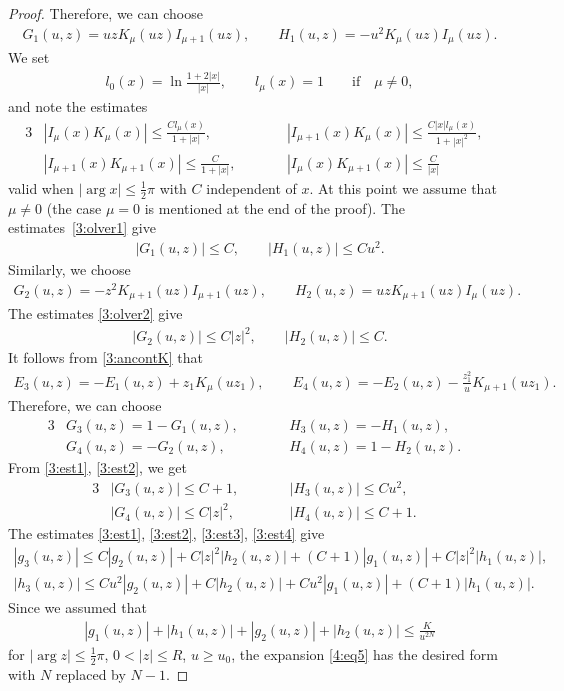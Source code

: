 \begin{proof}
Therefore, we can choose
\begin{gather*}
G_1(u,z) = uz K_\mu(uz)I_{\mu+1}(uz),\qquad
H_1(u,z) = -u^2K_\mu(uz)I_\mu(uz) .
\end{gather*}
We set
\begin{gather*}
l_0(x)=\ln\frac{1+2|x|}{|x|},\qquad l_\mu(x)=1\qquad\text{if} \quad \mu\ne 0,
\end{gather*}
and note the estimates \cite[(9.12)]{O}
\begin{alignat}{3}
&|I_\mu(x)K_\mu(x)|\le \frac{C l_\mu(x)}{1+|x|},\qquad&& |I_{\mu+1}(x)K_\mu(x)|\le \frac{C |x|l_\mu(x)}{1+|x|^2},& \label{3:olver1}\\
& |I_{\mu+1}(x)K_{\mu+1}(x)|\le \frac{C}{1+|x|},\qquad&& |I_\mu(x)K_{\mu+1}(x)|\le \frac{C}{|x|}& \label{3:olver2}
\end{alignat}
valid when $|\arg x|\le \frac12\pi$ with $C$ independent of $x$.
At this point we assume that $\mu\ne0$ (the case $\mu=0$ is mentioned at the end of the proof). The estimates~\eqref{3:olver1} give
\begin{gather}\label{3:est1}
|G_1(u,z)|\le C,\qquad |H_1(u,z)|\le C u^2.
\end{gather}
Similarly, we choose
\begin{gather*}
G_2(u,z) = -z^2K_{\mu+1}(uz)I_{\mu+1}(uz),\qquad
H_2(u,z) = uzK_{\mu+1}(uz)I_\mu(uz).
\end{gather*}
The estimates \eqref{3:olver2} give
\begin{gather}\label{3:est2}
|G_2(u,z)|\le C|z|^2,\qquad|H_2(u,z)|\le C.
\end{gather}
It follows from \eqref{3:ancontK} that
\begin{gather*}
E_3(u,z) = -E_1(u,z)+ z_1K_\mu(uz_1),\qquad
E_4(u,z) = -E_2(u,z)-\frac{z_1^2}{u}K_{\mu+1}(uz_1) .
\end{gather*}
Therefore, we can choose
\begin{alignat*}{3}
& G_3(u,z) = 1-G_1(u,z) ,\qquad &&
H_3(u,z) = -H_1(u,z),&\\
& G_4(u,z) = -G_2(u,z),\qquad&&
H_4(u,z) = 1-H_2(u,z).&
\end{alignat*}
From \eqref{3:est1}, \eqref{3:est2}, we get
\begin{alignat}{3}
& |G_3(u,z)|\le C+1,\qquad && |H_3(u,z)|\le C u^2,& \label{3:est3}\\
& |G_4(u,z)|\le C|z|^2,\qquad && |H_4(u,z)|\le C+1 .&\label{3:est4}
\end{alignat}
The estimates \eqref{3:est1}, \eqref{3:est2}, \eqref{3:est3}, \eqref{3:est4}
give
\begin{gather*}
|g_3(u,z)| \le C |g_2(u,z)| + C|z|^2|h_2(u,z)|+(C+1)|g_1(u,z)|+C|z|^2 |h_1(u,z)|,\\
|h_3(u,z)| \le C u^2|g_2(u,z)| + C|h_2(u,z)|+Cu^2|g_1(u,z)|+(C+1) |h_1(u,z)|.
\end{gather*}
Since we assumed that
\begin{gather*}
|g_1(u,z)|+|h_1(u,z)|+|g_2(u,z)|+|h_2(u,z)|\le \frac{K}{u^{2N}}
\end{gather*}
for $| \arg z|\le \frac12\pi$, $0<|z|\le R$, $u\ge u_0$,
the expansion \eqref{4:eq5} has the desired form with $N$ replaced by $N-1$.


\end{proof}
